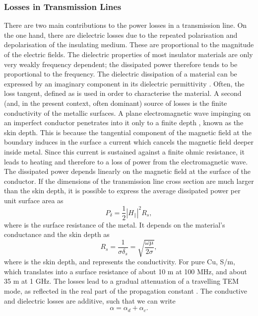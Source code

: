 \subsubsection{Losses in Transmission
Lines}\label{losses-in-transmission-lines}

There are two main contributions to the power losses in a transmission
line. On the one hand, there are dielectric losses due to the repeated
polarisation and depolarisation of the insulating medium. These are
proportional to the magnitude of the electric fields. The dielectric
properties of most insulator materials are only very weakly frequency
dependent; the dissipated power therefore tends to be proportional to
the frequency. The dielectric dissipation of a material can be expressed
by an imaginary component in its dielectric permittivity
. Often, the loss tangent, defined
as  is used in order to characterise
the material. A second (and, in the present context, often
dominant) source of losses is the finite conductivity of the metallic surfaces.
A plane electromagnetic wave impinging on an imperfect
conductor penetrates into it only to a finite depth , known as
the skin depth. This is because the tangential component of the magnetic
field at the boundary induces in the surface a current which cancels the
magnetic field deeper inside metal. Since this current is sustained
against a finite ohmic resistance, it leads to heating and therefore to
a loss of power from the electromagnetic wave. The dissipated power
depends linearly on the magnetic field at the surface of the conductor.
If the dimensions of the transmission line cross section are much larger
than the skin depth, it is possible to express the average dissipated power per
unit surface area as
%
\begin{equation}
P_\delta = \frac{1}{2}|H_\parallel|^2 R_s,
\end{equation}
%
where  is the surface resistance of the metal. It depends on the
material's conductance and the skin depth as
%
\begin{equation}
R_s = \frac{1}{\sigma \delta_s} = \sqrt{\frac{\omega\mu}{2\sigma}},
\end{equation}
%
where  is the skin depth, and \m{\sigma} represents the
conductivity. For pure Cu, S/m, which translates
into a surface resistance of about 10 m\m{\Omega} at 100 MHz, and about
35 m\m{\Omega} at 1 GHz. The losses lead to a gradual attenuation of a
travelling TEM mode, as reflected in the real part of the propagation
constant \m{\gamma}. The conductive and dielectric losses are additive,
such that we can write
%
\begin{equation}
\alpha = \alpha_d + \alpha_c.
\end{equation}

